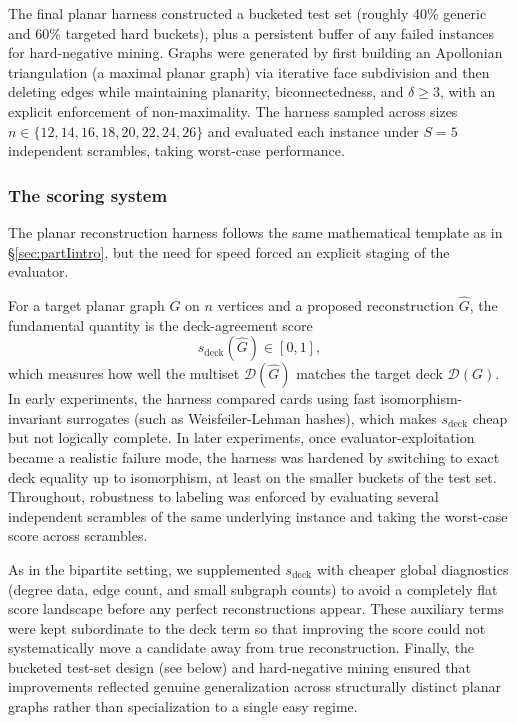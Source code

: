 \documentclass[11pt]{amsart}
\begin{document}
The final planar harness constructed a bucketed test set (roughly 40\% generic and 60\% targeted hard buckets), plus a persistent buffer of any failed instances for hard-negative mining.
Graphs were generated by first building an Apollonian triangulation (a maximal planar graph) via iterative face subdivision and then deleting edges while maintaining planarity, biconnectedness, and $\delta\ge 3$, with an explicit enforcement of non-maximality. The harness sampled across sizes $n\in\{12,14,16,18,20,22,24,26\}$ and evaluated each instance under $S=5$ independent scrambles, taking worst-case performance.


\subsubsection{The scoring system}
The planar reconstruction harness follows the same mathematical template as in \S\ref{sec:partIintro}, but the need for speed forced an explicit staging of the evaluator.

For a target planar graph $G$ on $n$ vertices and a proposed reconstruction $\widehat{G}$, the fundamental quantity is the deck-agreement score
\[
s_{\mathrm{deck}}(\widehat{G})\in[0,1],
\]
which measures how well the multiset $\mathcal{D}(\widehat{G})$ matches the target deck $\mathcal{D}(G)$.
In early experiments, the harness compared cards using fast isomorphism-invariant surrogates (such as Weisfeiler-Lehman hashes), which makes $s_{\mathrm{deck}}$ cheap but not logically complete.
In later experiments, once evaluator-exploitation became a realistic failure mode, the harness was hardened by switching to exact deck equality up to isomorphism, at least on the smaller buckets of the test set.
Throughout, robustness to labeling was enforced by evaluating several independent scrambles of the same underlying instance and taking the worst-case score across scrambles.

As in the bipartite setting, we supplemented $s_{\mathrm{deck}}$ with cheaper global diagnostics (degree data, edge count, and small subgraph counts) to avoid a completely flat score landscape before any perfect reconstructions appear.
These auxiliary terms were kept subordinate to the deck term so that improving the score could not systematically move a candidate away from true reconstruction.
Finally, the bucketed test-set design (see below) and hard-negative mining ensured that improvements reflected genuine generalization across structurally distinct planar graphs rather than specialization to a single easy regime.
\end{document}
